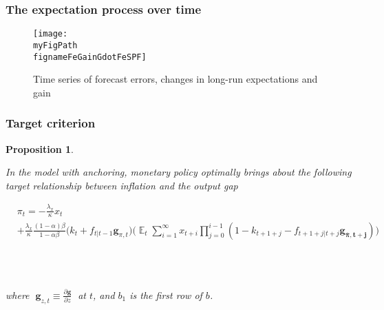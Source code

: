 \documentclass[10pt]{beamer}
\def \myFigPath {../../../figures/}
\DeclareMathOperator{\E}{\mathbb{E}}
\newtheorem{prop}{Proposition}
\def\fignameFeSPF{fe_SPF_command_anchoring_in_data_19_Sep_2020_11_45_59}
\def\fignameGainSPF{gain_SPF_command_anchoring_in_data_11_Oct_2020_11_08_39}
\def\fignameFeGainGdotFeSPF{fe_gain_gdot_fe_SPF_command_anchoring_in_data_18_Oct_2020_13_11_56}
\begin{document}
\begin{frame}[plain]  %
	\frametitle{The expectation process over time}

\begin{figure}[h!]
\texttt{[image: \\myFigPath \\fignameFeGainGdotFeSPF]}
\caption{Time series of forecast errors, changes in long-run expectations and gain}
\label{fe_in_data}
\end{figure}

%
%


\end{frame}


\begin{frame}[plain]  %
	\frametitle{Target criterion}
	\label{fullTC}
	
	\begin{prop} 

\

In the model with anchoring, monetary policy optimally brings about the following target relationship between inflation and the output gap

\begin{align*}
& \pi_t  = -\frac{\lambda_x}{\kappa}x_t \\
& + \frac{\lambda_x}{\kappa}\frac{(1-\alpha)\beta}{1-\alpha\beta} \bigg(k_t+f_{t|t-1}\mathbf{g}_{\pi,t}\bigg)
\bigg(\E_t\sum_{i=1}^{\infty}x_{t+i}\prod_{j=0}^{i-1}(1-k_{t+1+j} - f_{t+1+j|t+j}\mathbf{g_{\bar{\pi}, t+j}}) \bigg)
\end{align*}
\

\

where $\; \mathbf{g}_{z,t} \equiv \frac{\partial \mathbf{g}}{\partial z}\;$ at $t$, and $b_1$ is the first row of $b$.
	\end{prop}



\vfill


\hyperlink{anchTC}{}	\hfill \hyperlink{generalTC}{} 


\end{frame}
\end{document}
